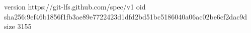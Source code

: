 version https://git-lfs.github.com/spec/v1
oid sha256:9ef46b1856f1fb3ae89e7722423d1dfd2bd51bc5186040a06ac02be6cf2dac9d
size 3155
